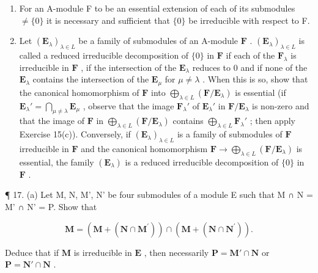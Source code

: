 \begin{enumerate}
\def\labelenumi{(\alph{enumi})}
\item
  For an A-module F to be an essential extension of each of its submodules \(\neq \{0\}\) it is necessary and sufficient that \(\{0\}\) be irreducible with respect to F.
\item
  Let \((\mathbf{E}_{\lambda})_{\lambda \in L}\) be a family of submodules of an A-module \(\mathbf{F}\) . \((\mathbf{E}_{\lambda})_{\lambda \in L}\) is called a reduced irreducible decomposition of \(\{0\}\) in \(\mathbf{F}\) if each of the \(\mathbf{F}_{\lambda}\) is irreducible in \(\mathbf{F}\) , if the intersection of the \(\mathbf{E}_{\lambda}\) reduces to 0 and if none of the \(\mathbf{E}_{\lambda}\) contains the intersection of the \(\mathbf{E}_{\mu}\) for \(\mu \neq \lambda\) . When this is so, show that the canonical homomorphism of \(\mathbf{F}\) into \(\bigoplus_{\lambda \in L} (\mathbf{F} / \mathbf{E}_{\lambda})\) is essential (if \(\mathbf{E}_{\lambda}' = \bigcap_{\mu \neq \lambda} \mathbf{E}_{\mu}\) , observe that the image \(\mathbf{F}_{\lambda}'\) of \(\mathbf{E}_{\lambda}'\) in \(\mathbf{F} / \mathbf{E}_{\lambda}\) is non-zero and that the image of \(\mathbf{F}\) in \(\bigoplus_{\lambda \in L} (\mathbf{F} / \mathbf{E}_{\lambda})\) contains \(\bigoplus_{\lambda \in L} \mathbf{F}_{\lambda}'\) ; then apply Exercise 15(c)). Conversely, if \((\mathbf{E}_{\lambda})_{\lambda \in L}\) is a family of submodules of \(\mathbf{F}\) irreducible in \(\mathbf{F}\) and the canonical homomorphism \(\mathbf{F} \to \bigoplus_{\lambda \in L} (\mathbf{F} / \mathbf{E}_{\lambda})\) is essential, the family \((\mathbf{E}_{\lambda})\) is a reduced irreducible decomposition of \(\{0\}\) in \(\mathbf{F}\) .
\end{enumerate}

¶ 17. (a) Let M, N, M', N' be four submodules of a module E such that M ∩ N = M' ∩ N' = P. Show that

\[
\mathbf {M} = (\mathbf {M} + (\mathbf {N} \cap \mathbf {M} ^ {\prime})) \cap (\mathbf {M} + (\mathbf {N} \cap \mathbf {N} ^ {\prime})).
\]

Deduce that if \(\mathbf{M}\) is irreducible in \(\mathbf{E}\) , then necessarily \(\mathbf{P} = \mathbf{M}' \cap \mathbf{N}\) or \(\mathbf{P} = \mathbf{N}' \cap \mathbf{N}\) .


